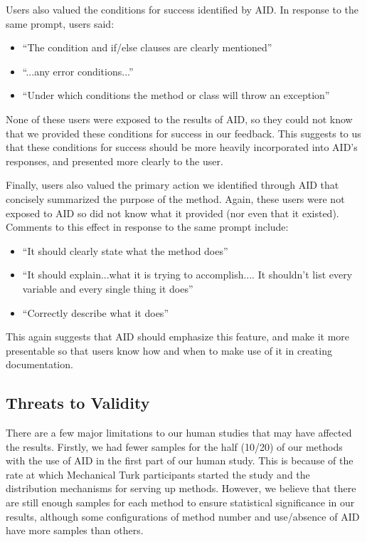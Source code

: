 \documentclass[preprint]{sigplanconf}
\begin{document}
Users also valued the conditions for success identified by AID. In response to the same prompt, users said:

\begin{itemize}
\item ``The condition and if/else clauses are clearly mentioned''
\item ``...any error conditions...''
\item ``Under which conditions the method or class will throw an exception''
\end{itemize}

None of these users were exposed to the results of AID, so they could not know that we provided these conditions for success in our feedback. This suggests to us that these conditions for success should be more heavily incorporated into AID's responses, and presented more clearly to the user.

Finally, users also valued the primary action we identified through AID that concisely summarized the purpose of the method. Again, these users were not exposed to AID so did not know what it provided (nor even that it existed). Comments to this effect in response to the same prompt include:

\begin{itemize}
\item ``It should clearly state what the method does''
\item ``It should explain...what it is trying to accomplish.... It shouldn't list every variable and every single thing it does''
\item ``Correctly describe what it does''
\end{itemize}

This again suggests that AID should emphasize this feature, and make it more presentable so that users know how and when to make use of it in creating documentation.

\subsection{Threats to Validity}
There are a few major limitations to our human studies that may have affected the results. Firstly, we had fewer samples for the half (10/20) of our methods with the use of AID in the first part of our human study. This is because of the rate at which Mechanical Turk participants started the study and the distribution mechanisms for serving up methods. However, we believe that there are still enough samples for each method to ensure statistical significance in our results, although some configurations of method number and use/absence of AID have more samples than others.
\end{document}
